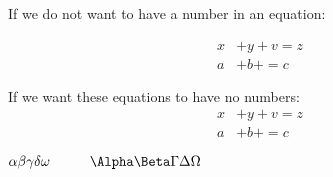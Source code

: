 \documentclass{article}
\begin{document}
If we do not want to have a number in an equation:

\begin{align}
x&+y+v=z \nonumber \\
a&+b+=c 
\end{align}

If we want these equations to have no numbers:
\begin{align*}
x&+y+v=z \nonumber \\
a&+b+=c 
\end{align*}


\iffalse
------------------------------------------------------
MATH SYMBOLS AND GREEK LETTERS
- start by creating a mathematical environment using \( and \)
------------------------------------------------------
\fi

\(
\alpha \beta \gamma \delta \omega \hspace{1cm}  \Alpha \Beta \Gamma \Delta \Omega
\)
\end{document}
